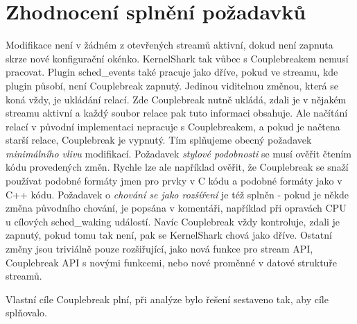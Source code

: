 \section{Zhodnocení splnění požadavků}
Modifikace není v žádném z otevřených streamů aktivní, dokud není zapnuta skrze nové konfigurační okénko. KernelShark tak vůbec s Couplebreakem nemusí pracovat. Plugin sched\_events také pracuje jako dříve, pokud ve streamu, kde plugin působí, není Couplebreak zapnutý. Jedinou viditelnou změnou, která se koná vždy, je ukládání relací. Zde Couplebreak nutně ukládá, zdali je v nějakém streamu aktivní a každý soubor relace pak tuto informaci obsahuje. Ale načítání relací v původní implementaci nepracuje s Couplebreakem, a pokud je načtena starší relace, Couplebreak je vypnutý. Tím splňujeme obecný požadavek \emph{minimálního vlivu} modifikací. Požadavek \emph{stylové podobnosti} se musí ověřit čtením kódu provedených změn. Rychle lze ale například ověřit, že Couplebreak se snaží používat podobné formáty jmen pro prvky v C kódu a podobné formáty jako v C++ kódu. Požadavek o \emph{chování se jako rozšíření} je též splněn - pokud je někde změna původního chování, je popsána v komentáři, například při opravách CPU u cílových sched\_waking událostí. Navíc Couplebreak vždy kontroluje, zdali je zapnutý, pokud tomu tak není, pak se KernelShark chová jako dříve. Ostatní změny jsou triviálně pouze rozšiřující, jako nová funkce pro stream API, Couplebreak API s novými funkcemi, nebo nové proměnné v datové struktuře streamů.

Vlastní cíle Couplebreak plní, při analýze bylo řešení sestaveno tak, aby cíle splňovalo.